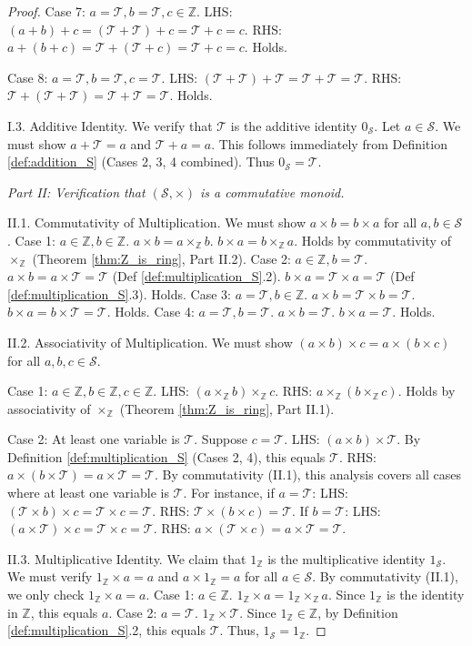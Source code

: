 \documentclass[11pt, a4paper]{article}
\theoremstyle{plain}
\theoremstyle{definition}
\numberwithin{equation}{section}
\newcommand{\Z}{\mathbb{Z}}
\newcommand{\Tobj}{\mathcal{T}} %
\newcommand{\SemiringS}{\mathcal{S}}
\begin{document}
\begin{proof}
Case 7: $a=\Tobj, b=\Tobj, c \in \Z$.
LHS: $(a+b)+c = (\Tobj+\Tobj)+c = \Tobj+c = c$.
RHS: $a+(b+c) = \Tobj+(\Tobj+c) = \Tobj+c = c$. Holds.

Case 8: $a=\Tobj, b=\Tobj, c=\Tobj$.
LHS: $(\Tobj+\Tobj)+\Tobj = \Tobj+\Tobj = \Tobj$.
RHS: $\Tobj+(\Tobj+\Tobj) = \Tobj+\Tobj = \Tobj$. Holds.

I.3. Additive Identity. We verify that $\Tobj$ is the additive identity $0_{\SemiringS}$.
Let $a \in \SemiringS$. We must show $a+\Tobj=a$ and $\Tobj+a=a$. This follows immediately from Definition \ref{def:addition_S} (Cases 2, 3, 4 combined). Thus $0_{\SemiringS}=\Tobj$.

\emph{Part II: Verification that $(\SemiringS, \times)$ is a commutative monoid.}

II.1. Commutativity of Multiplication. We must show $a\times b = b\times a$ for all $a, b \in \SemiringS$.
Case 1: $a \in \Z, b \in \Z$. $a\times b = a\times_{\Z} b$. $b\times a = b\times_{\Z} a$. Holds by commutativity of $\times_{\Z}$ (Theorem \ref{thm:Z_is_ring}, Part II.2).
Case 2: $a \in \Z, b=\Tobj$. $a\times b = a\times\Tobj = \Tobj$ (Def \ref{def:multiplication_S}.2). $b\times a = \Tobj\times a = \Tobj$ (Def \ref{def:multiplication_S}.3). Holds.
Case 3: $a=\Tobj, b \in \Z$. $a\times b = \Tobj\times b = \Tobj$. $b\times a = b\times\Tobj = \Tobj$. Holds.
Case 4: $a=\Tobj, b=\Tobj$. $a\times b = \Tobj$. $b\times a = \Tobj$. Holds.

II.2. Associativity of Multiplication. We must show $(a\times b)\times c = a\times(b\times c)$ for all $a, b, c \in \SemiringS$.

Case 1: $a \in \Z, b \in \Z, c \in \Z$.
LHS: $(a\times_{\Z} b)\times_{\Z} c$. RHS: $a\times_{\Z}(b\times_{\Z} c)$. Holds by associativity of $\times_{\Z}$ (Theorem \ref{thm:Z_is_ring}, Part II.1).

Case 2: At least one variable is $\Tobj$. Suppose $c=\Tobj$.
LHS: $(a\times b)\times\Tobj$. By Definition \ref{def:multiplication_S} (Cases 2, 4), this equals $\Tobj$.
RHS: $a\times(b\times\Tobj) = a\times\Tobj = \Tobj$.
By commutativity (II.1), this analysis covers all cases where at least one variable is $\Tobj$. For instance, if $a=\Tobj$:
LHS: $(\Tobj\times b)\times c = \Tobj\times c = \Tobj$.
RHS: $\Tobj\times(b\times c) = \Tobj$.
If $b=\Tobj$:
LHS: $(a\times\Tobj)\times c = \Tobj\times c = \Tobj$.
RHS: $a\times(\Tobj\times c) = a\times\Tobj = \Tobj$.

II.3. Multiplicative Identity. We claim that $1_{\Z}$ is the multiplicative identity $1_{\SemiringS}$. We must verify $1_{\Z}\times a = a$ and $a\times 1_{\Z} = a$ for all $a \in \SemiringS$. By commutativity (II.1), we only check $1_{\Z}\times a = a$.
Case 1: $a \in \Z$. $1_{\Z}\times a = 1_{\Z}\times_{\Z} a$. Since $1_{\Z}$ is the identity in $\Z$, this equals $a$.
Case 2: $a=\Tobj$. $1_{\Z}\times\Tobj$. Since $1_{\Z} \in \Z$, by Definition \ref{def:multiplication_S}.2, this equals $\Tobj$.
Thus, $1_{\SemiringS}=1_{\Z}$.


\end{proof}
\end{document}
